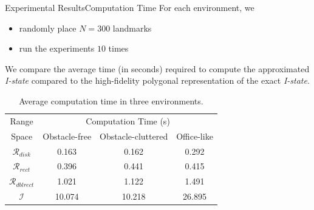 \documentclass[10pt]{beamer}
\begin{document}
\begin{frame}{Experimental Results}{Computation Time}
  For each environment, we
  \begin{itemize}
  \item randomly place $N = 300$ landmarks 
  \item run the  experiments $10$ times
  \end{itemize} 
  \begin{block}{}
    We compare the average time (in seconds) required to compute the approximated
    \emph{I-state} compared to the high-fidelity polygonal representation of the
    exact \emph{I-state}.
  \end{block}
\begin{table}
  \footnotesize\centering
    \begin{tabular}{cccc} 
    \hline
    Range & \multicolumn{3}{c}{Computation Time (s)}  \\
    Space & Obstacle-free & Obstacle-cluttered & Office-like\\
    \hline
    $\mathcal{R}_{disk}$ & 0.163  & 0.162   & 0.292  \\ 
    \hline
    $\mathcal{R}_{rect}$ & 0.396   & 0.441  & 0.415  \\
    \hline
    $\mathcal{R}_{dblrect}$ & 1.021  & 1.122  & 1.491  \\
    \hline
    $\mathcal{I}$ & 10.074  & 10.218  & 26.895  \\
    \hline
    \end{tabular}
    \caption{\scriptsize{Average computation time in three environments.}}
\end{table}
\end{frame}
\end{document}
